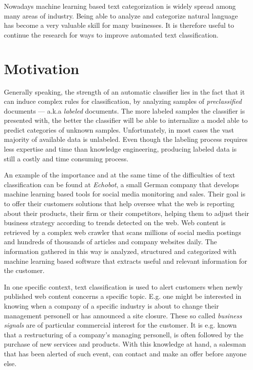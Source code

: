 Nowadays machine learning based text categorization is widely spread among many
areas of industry. Being able to analyze and categorize natural language has
become a very valuable skill for many businesses. It is therefore useful to
continue the research for ways to improve automated text classification. 

\section{Motivation}
\label{sec:Motivation}
Generally speaking, the strength of an automatic classifier lies in the fact
that it can induce complex rules for classification, by analyzing samples of
\textit{preclassified} documents --- a.k.a \textit{labeled} documents. 
The more labeled samples the classifier is presented with, the
better the classifier will be able to internalize a model able to predict
categories of unknown samples.
Unfortunately, in most cases the vast majority of available data
is unlabeled. Even though the labeling process requires less expertise and
time than knowledge engineering, producing labeled data is still a costly and
time consuming process.

An example of the importance and at the same time of the difficulties of text
classification can be found at \textit{Echobot}, a small
German company that develops machine learning based tools for social media
monitoring and sales. Their goal is to offer their customers solutions that
help oversee what the web is reporting about their products, their firm or
their competitors, helping them to adjust their business strategy according 
to trends detected on the web. Web content is retrieved by a complex web crawler
that scans millions of social media postings and hundreds of thousands
of articles and company websites daily. The information gathered in this way is
analyzed, structured and categorized with machine learning based software that
extracts useful and relevant information for the customer.

In one specific context, text classification is used to alert customers when
newly published web content concerns a specific topic. E.g. one might
be interested in knowing when a company of a specific industry is about to change
their management personell or has announced a site closure. 
These so called \textit{business signals} are of particular commercial interest 
for the customer. It is e.g. known that a restructuring 
of a company's managing personell, is often followed by the purchase of new
services and products. With this knowledge at hand, a salesman that has been
alerted of such event, can contact and make an offer before anyone else.

